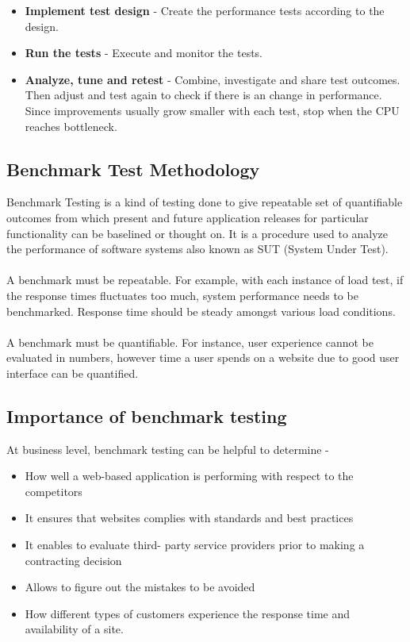 \documentclass[../thesis.tex]{subfiles}
\begin{document}
\begin{itemize}
		\item \textbf{Implement test design} - Create the performance tests according to the design.

		\item \textbf{Run the tests} - Execute and monitor the tests.

		\item \textbf{Analyze, tune and retest} - Combine, investigate and share test outcomes. Then adjust and test again to check if there is an change in performance. Since improvements usually grow smaller with each test, stop when the CPU reaches bottleneck.
	\end{itemize}
	
	\subsection{Benchmark Test Methodology}
	Benchmark Testing is a kind of testing done to give repeatable set of quantifiable outcomes from which present and future application releases for particular functionality can be baselined or thought on. It is a procedure used to analyze the performance of software systems also known as SUT (System Under Test).
	\paragraph{}
	A benchmark must be repeatable. For example, with each instance of load test, if the response times fluctuates too much, system performance needs to be benchmarked. Response time should be steady amongst various load conditions.
	\paragraph{}
	A benchmark must be quantifiable. For instance, user experience cannot be evaluated in numbers, however time a user spends on a website due to good user interface can be quantified.
	
	\subsection*{Importance of benchmark testing}
	At business level, benchmark testing can be helpful to determine - 

	\begin{itemize}
		\item How well a web-based application is performing with respect to the competitors
		\item It ensures that websites complies with standards and best practices
		\item It enables to evaluate third- party service providers prior to making a contracting decision
		\item Allows to figure out the mistakes to be avoided
		\item How different types of customers experience the response time and availability of a site.
	\end{itemize}
\end{document}

